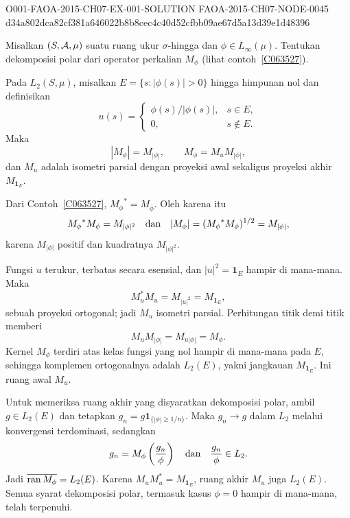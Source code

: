 \begin{o001solution}
  {O001-FAOA-2015-CH07-EX-001-SOLUTION}
  {FAOA-2015-CH07-NODE-0045}
  {d34a802dca82cf381a646022b8b8cec4c40d52cfbb09ae67d5a13d39e1d48396}
\begin{o001statement}
Misalkan $(S, \mathcal{A},\mu)$ suatu ruang ukur $\sigma$-hingga dan $\phi \in
L_\infty(\mu)$. Tentukan dekomposisi polar dari
operator perkalian $M_\phi$ (lihat contoh~\ref{C063527}).
\end{o001statement}
\begin{o001answer}
Pada $L_2(S,\mu)$, misalkan $E=\{s:|\phi(s)|>0\}$ hingga himpunan nol dan
definisikan
\[
 u(s)=\begin{cases}\phi(s)/|\phi(s)|,&s\in E,\\0,&s\notin E.\end{cases}
\]
Maka
\[
  |M_\phi|=M_{|\phi|},\qquad M_\phi=M_uM_{|\phi|},
\]
dan $M_u$ adalah isometri parsial dengan proyeksi awal sekaligus proyeksi
akhir $M_{\mathbf1_E}$.
\end{o001answer}
\begin{o001proof}
Dari Contoh~\ref{C063527}, ${M_\phi}^*=M_{\overline\phi}$. Oleh karena itu
\[
 {M_\phi}^*M_\phi=M_{|\phi|^2}
 \quad\hbox{dan}\quad
 |M_\phi|=({M_\phi}^*M_\phi)^{1/2}=M_{|\phi|},
\]
karena $M_{|\phi|}$ positif dan kuadratnya $M_{|\phi|^2}$.

Fungsi $u$ terukur, terbatas secara esensial, dan
$|u|^2=\mathbf1_E$ hampir di mana-mana. Maka
\[
  M_u^*M_u=M_{|u|^2}=M_{\mathbf1_E},
\]
sebuah proyeksi ortogonal; jadi $M_u$ isometri parsial. Perhitungan titik
demi titik memberi
\[
 M_uM_{|\phi|}=M_{u|\phi|}=M_\phi.
\]
Kernel $M_\phi$ terdiri atas kelas fungsi yang nol hampir di mana-mana pada
$E$, sehingga komplemen ortogonalnya adalah $L_2(E)$, yakni jangkauan
$M_{\mathbf1_E}$. Ini ruang awal $M_u$.

Untuk memeriksa ruang akhir yang disyaratkan dekomposisi polar, ambil
$g\in L_2(E)$ dan tetapkan
$g_n=g\mathbf1_{\{|\phi|\ge1/n\}}$. Maka $g_n\to g$ dalam $L_2$ melalui
konvergensi terdominasi, sedangkan
\[
 g_n=M_\phi\left(\frac{g_n}{\phi}\right)
 \quad\hbox{dan}\quad
 \frac{g_n}{\phi}\in L_2.
\]
Jadi $\overline{\operatorname{ran} M_\phi}=L_2(E)$. Karena $M_uM_u^*=M_{\mathbf1_E}$,
ruang akhir $M_u$ juga $L_2(E)$. Semua syarat dekomposisi polar, termasuk
kasus $\phi=0$ hampir di mana-mana, telah terpenuhi.
\end{o001proof}
\end{o001solution}
